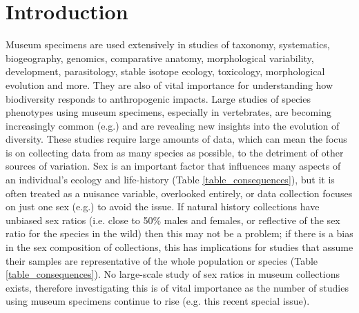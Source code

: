 \documentclass[a4paper, 12pt]{article}
\begin{document}
\section{Introduction}\label{main}
Museum specimens are used extensively in studies of taxonomy, systematics, biogeography, genomics, comparative anatomy, morphological variability, development, parasitology, stable isotope ecology, toxicology, morphological evolution and more\cite{lister2011natural,pyke2010biological,mclean2015natural}. 
They are also of vital importance for understanding how biodiversity responds to anthropogenic impacts\cite{meineke2018biological}. 
Large studies of species phenotypes using museum specimens, especially in vertebrates, are becoming increasingly common (e.g.\cite{cooney2017mega,felice2018developmental}) and are revealing new insights into the evolution of diversity. 
These studies require large amounts of data, which can mean the focus is on collecting data from as many species as possible, to the detriment of other sources of variation. 
Sex is an important factor that influences many aspects of an individual's ecology and life-history (Table \ref{table_consequences}), but it is often treated as a nuisance variable, overlooked entirely, or data collection focuses on just one sex (e.g.\cite{cooper2009factors}) to avoid the issue. 
If natural history collections have unbiased sex ratios (i.e. close to 50\% males and females, or reflective of the sex ratio for the species in the wild\cite{karlin1986theoretical}) then this may not be a problem; if there is a bias in the sex composition of collections, this has implications for studies that assume their samples are representative of the whole population or species (Table \ref{table_consequences}). 
No large-scale study of sex ratios in museum collections exists, therefore investigating this is of vital importance as the number of studies using museum specimens continue to rise (e.g. this recent special issue\cite{meineke2018biological}).
\end{document}
